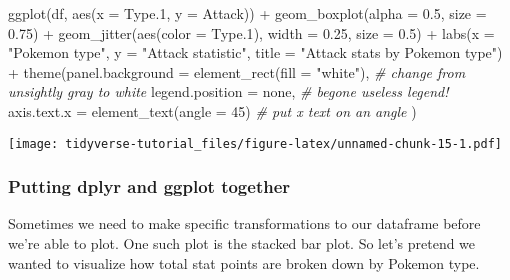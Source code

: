 \documentclass[
]{article}
\newenvironment{Shaded}{\begin{snugshade}}{\end{snugshade}}
\newcommand{\AttributeTok}[1]{\textcolor[rgb]{0.77,0.63,0.00}{#1}}
\newcommand{\CommentTok}[1]{\textcolor[rgb]{0.56,0.35,0.01}{\textit{#1}}}
\newcommand{\DecValTok}[1]{\textcolor[rgb]{0.00,0.00,0.81}{#1}}
\newcommand{\FloatTok}[1]{\textcolor[rgb]{0.00,0.00,0.81}{#1}}
\newcommand{\FunctionTok}[1]{\textcolor[rgb]{0.00,0.00,0.00}{#1}}
\newcommand{\NormalTok}[1]{#1}
\newcommand{\SpecialCharTok}[1]{\textcolor[rgb]{0.00,0.00,0.00}{#1}}
\newcommand{\StringTok}[1]{\textcolor[rgb]{0.31,0.60,0.02}{#1}}
\begin{document}
\begin{Shaded}
\begin{Highlighting}[]
\FunctionTok{ggplot}\NormalTok{(df, }\FunctionTok{aes}\NormalTok{(}\AttributeTok{x =}\NormalTok{ Type}\FloatTok{.1}\NormalTok{, }\AttributeTok{y =}\NormalTok{ Attack)) }\SpecialCharTok{+}
  \FunctionTok{geom\_boxplot}\NormalTok{(}\AttributeTok{alpha =} \FloatTok{0.5}\NormalTok{,                     }
               \AttributeTok{size =} \FloatTok{0.75}\NormalTok{) }\SpecialCharTok{+}                   
  \FunctionTok{geom\_jitter}\NormalTok{(}\FunctionTok{aes}\NormalTok{(}\AttributeTok{color =}\NormalTok{ Type}\FloatTok{.1}\NormalTok{),}
              \AttributeTok{width =} \FloatTok{0.25}\NormalTok{,                     }
              \AttributeTok{size =} \FloatTok{0.5}\NormalTok{) }\SpecialCharTok{+}
  \FunctionTok{labs}\NormalTok{(}\AttributeTok{x =} \StringTok{"Pokemon type"}\NormalTok{,                       }
       \AttributeTok{y =} \StringTok{"Attack statistic"}\NormalTok{,                   }
       \AttributeTok{title =} \StringTok{"Attack stats by Pokemon type"}\NormalTok{) }\SpecialCharTok{+}
  \FunctionTok{theme}\NormalTok{(}\AttributeTok{panel.background =} \FunctionTok{element\_rect}\NormalTok{(}\AttributeTok{fill =} \StringTok{"white"}\NormalTok{),  }\CommentTok{\# change from unsightly gray to white}
        \AttributeTok{legend.position =} \StringTok{\textquotesingle{}none\textquotesingle{}}\NormalTok{,                         }\CommentTok{\# begone useless legend!}
        \AttributeTok{axis.text.x =} \FunctionTok{element\_text}\NormalTok{(}\AttributeTok{angle =} \DecValTok{45}\NormalTok{)            }\CommentTok{\# put x text on an angle}
\NormalTok{  )}
\end{Highlighting}
\end{Shaded}

\texttt{[image: tidyverse-tutorial\_files/figure-latex/unnamed-chunk-15-1.pdf]}

\hypertarget{putting-dplyr-and-ggplot-together}{%
\subsubsection{Putting dplyr and ggplot
together}\label{putting-dplyr-and-ggplot-together}}

Sometimes we need to make specific transformations to our dataframe
before we're able to plot. One such plot is the stacked bar plot. So
let's pretend we wanted to visualize how total stat points are broken
down by Pokemon type.
\end{document}

